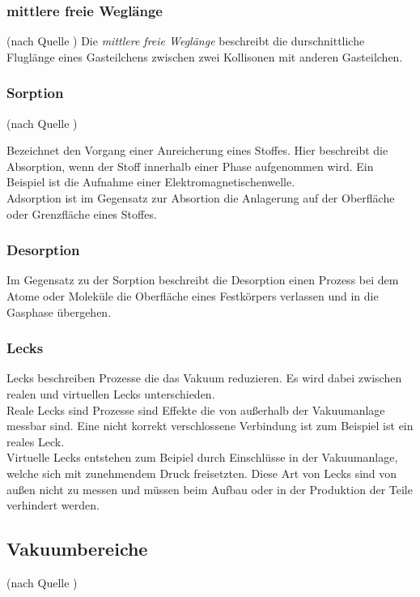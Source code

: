 		\subsubsection{mittlere freie Weglänge}(nach Quelle \cite{wiki:mfW})
			\noindent
			Die \textit{mittlere freie Weglänge} beschreibt die durschnittliche Fluglänge eines Gasteilchens zwischen zwei Kollisonen mit anderen Gasteilchen.

		\subsubsection{Sorption}(nach Quelle \cite{wiki:sor})
			
			\noindent
			Bezeichnet den Vorgang einer Anreicherung eines Stoffes. 
			Hier beschreibt die Absorption, wenn der Stoff innerhalb einer Phase aufgenommen wird. Ein Beispiel ist die Aufnahme einer Elektromagnetischenwelle.\\
			Adsorption ist im Gegensatz zur Absortion die Anlagerung auf der Oberfläche oder Grenzfläche eines Stoffes.

		\subsubsection{Desorption}

			Im Gegensatz zu der Sorption beschreibt die Desorption einen Prozess bei dem Atome oder Moleküle die Oberfläche eines Festkörpers verlassen und in die Gasphase übergehen.
		
		\subsubsection{Lecks}

			Lecks beschreiben Prozesse die das Vakuum reduzieren. Es wird dabei zwischen realen und virtuellen Lecks unterschieden.\\
			Reale Lecks sind Prozesse sind Effekte die von außerhalb der Vakuumanlage messbar sind. Eine nicht korrekt verschlossene Verbindung ist zum Beispiel ist ein reales Leck.\\
			Virtuelle Lecks entstehen zum Beipiel durch Einschlüsse in der Vakuumanlage, welche sich mit zunehmendem Druck freisetzten.
			Diese Art von Lecks sind von außen nicht zu messen und müssen beim Aufbau oder in der Produktion der Teile verhindert werden.  		

	\subsection{Vakuumbereiche}(nach Quelle \cite{pfeiffer:grund})

